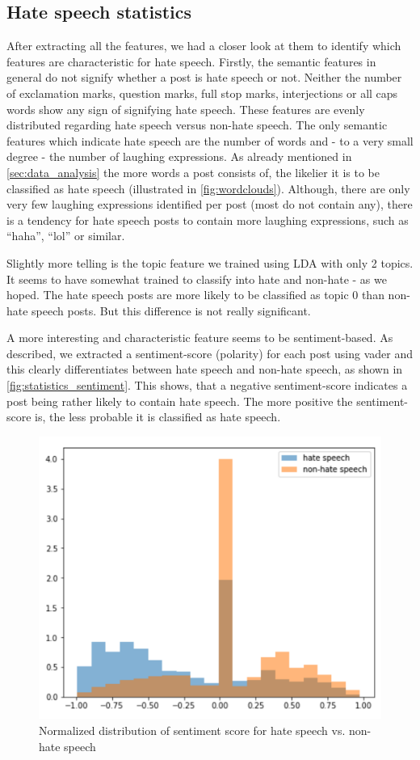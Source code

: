 \subsection{Hate speech statistics}
\label{ch:experimentDb}

After extracting all the features, we had a closer look at them to identify which features are characteristic for hate speech.
Firstly, the semantic features in general do not signify whether a post is hate speech or not. Neither the number of exclamation marks, question marks, full stop marks, interjections or all caps words show any sign of signifying hate speech. These features are evenly distributed regarding hate speech versus non-hate speech.
The only semantic features which indicate hate speech are the number of words and - to a very small degree - the number of laughing expressions.
As already mentioned in \autoref{sec:data_analysis} the more words a post consists of, the likelier it is to be classified as hate speech (illustrated in \autoref{fig:wordclouds}).
Although, there are only very few laughing expressions identified per post (most do not contain any), there is a tendency for hate speech posts to contain more laughing expressions, such as \enquote{haha}, \enquote{lol} or similar.

Slightly more telling is the topic feature we trained using LDA with only 2 topics. It seems to have somewhat trained to classify into hate and non-hate - as we hoped. The hate speech posts are more likely to be classified as topic 0 than non-hate speech posts. But this difference is not really significant.

A more interesting and characteristic feature seems to be sentiment-based. As described, we extracted a sentiment-score (polarity) for each post using vader and this clearly differentiates between hate speech and non-hate speech, as shown in \autoref{fig:statistics_sentiment}.
This shows, that a negative sentiment-score indicates a post being rather likely to contain hate speech. The more positive the sentiment-score is, the less probable it is classified as hate speech.

\begin{figure}[ht]
	\centering
	\includegraphics[width=0.7\linewidth]{figures/statistics_sentiment.png}
	\caption{Normalized distribution of sentiment score for hate speech vs. non-hate speech}
	\label{fig:statistics_sentiment}
\end{figure}

